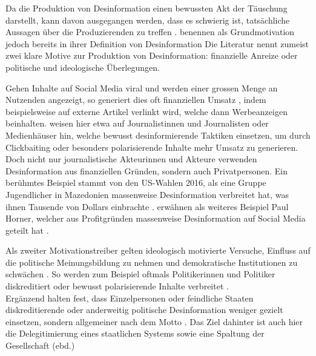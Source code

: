 \documentclass[12pt,a4paper]{article}        %
\begin{document}
Da die Produktion von Desinformation einen bewussten Akt der Täuschung darstellt, kann davon ausgegangen werden, dass es schwierig ist, tatsächliche Aussagen über die Produzierenden zu treffen \parencite[73]{lecheler_disinformation_2022}. \textcite[39]{pennycook_lazy_2019} benennen als Grundmotivation jedoch bereits in ihrer Definition von Desinformation  Die Literatur nennt zumeist zwei klare Motive zur Produktion von Desinformation: finanzielle Anreize oder politische und ideologische Überlegungen.

Gehen Inhalte auf Social Media viral und werden einer grossen Menge an Nutzenden angezeigt, so generiert dies oft finanziellen Umsatz \parencites[217]{allcott_social_2017}[3]{tandoc_jr_facts_2019}[157]{marx_fake_2020}, indem beispielsweise auf externe Artikel verlinkt wird, welche dann Werbeanzeigen beinhalten. \textcite[76]{lecheler_disinformation_2022} weisen hier etwa auf Journalistinnen und Journalisten oder Medienhäuser hin, welche bewusst desinformierende Taktiken einsetzen, um durch Clickbaiting oder besonders polarisierende Inhalte mehr Umsatz zu generieren. \\
Doch nicht nur journalistische Akteurinnen und Akteure verwenden Desinformation aus finanziellen Gründen, sondern auch Privatpersonen. Ein berühmtes Beispiel stammt von den US-Wahlen 2016, als eine Gruppe Jugendlicher in Mazedonien massenweise Desinformation verbreitet hat, was ihnen Tausende von Dollars einbrachte \parencites[217]{allcott_social_2017}[vgl.\ auch][]{subramanian_meet_2017}[3]{tandoc_jr_facts_2019}. \textcite[217]{allcott_social_2017} erwähnen als weiteres Beispiel Paul Horner, welcher aus Profitgründen massenweise Desinformation auf Social Media geteilt hat \parencite[vgl.\ auch][]{dewey_facebook_2016}.

Als zweiter Motivationstreiber gelten ideologisch motivierte Versuche, Einfluss auf die politische Meinungsbildung zu nehmen und demokratische Institutionen zu schwächen \parencites[225]{schmidt_meinungsbildung_2022}[75]{lecheler_disinformation_2022}[157]{marx_fake_2020}. So werden zum Beispiel oftmals Politikerinnen und Politiker diskreditiert \parencites[3]{tandoc_jr_facts_2019}[217]{allcott_social_2017} oder bewusst polarisierende Inhalte verbreitet \parencites[8]{european_parliament_directorate-general_for_external_policies_of_the_union_impact_2021}[3]{tandoc_jr_facts_2019}.\\
Ergänzend halten \textcite[182]{weidner_fake_2019} fest, dass Einzelpersonen oder feindliche Staaten diskreditierende oder anderweitig politische Desinformation weniger gezielt einsetzen, sondern allgemeiner nach dem Motto . Das Ziel dahinter ist auch hier die Delegitimierung eines staatlichen Systems sowie eine Spaltung der Gesellschaft (ebd.)
\end{document}
